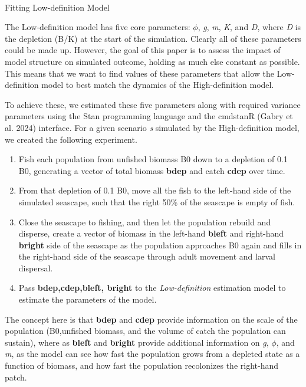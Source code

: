 \documentclass[
  default,
  lineno,
  referee]{sn-jnl}
\makeatletter
\let\oldparagraph\paragraph
\renewcommand{\paragraph}{
    \@ifstar
      \xxxParagraphStar
      \xxxParagraphNoStar
  }
\newcommand{\xxxParagraphStar}[1]{\oldparagraph*{#1}\mbox{}}
\newcommand{\xxxParagraphNoStar}[1]{\oldparagraph{#1}\mbox{}}
\providecommand{\tightlist}{%
  \setlength{\itemsep}{0pt}\setlength{\parskip}{0pt}}\usepackage{longtable,booktabs,array}
\makeatother
\begin{document}
\paragraph{Fitting Low-definition
Model}\label{fitting-low-definition-model}

The Low-definition model has five core parameters: \(\phi\), \emph{g},
\emph{m}, \emph{K}, and \emph{D}, where \emph{D} is the depletion (B/K)
at the start of the simulation. Clearly all of these parameters could be
made up. However, the goal of this paper is to assess the impact of
model structure on simulated outcome, holding as much else constant as
possible. This means that we want to find values of these parameters
that allow the Low-definition model to best match the dynamics of the
High-definition model.

To achieve these, we estimated these five parameters along with required
variance parameters using the Stan programming language and the cmdstanR
(Gabry et al. 2024) interface. For a given scenario \emph{s} simulated
by the High-definition model, we created the following experiment.

\begin{enumerate}
\def\labelenumi{\arabic{enumi}.}
\tightlist
\item
  Fish each population from unfished biomass B0 down to a depletion of
  0.1 B0, generating a vector of total biomass \textbf{bdep} and catch
  \textbf{cdep} over time.
\item
  From that depletion of 0.1 B0, move all the fish to the left-hand side
  of the simulated seascape, such that the right 50\% of the seascape is
  empty of fish.
\item
  Close the seascape to fishing, and then let the population rebuild and
  disperse, create a vector of biomass in the left-hand \textbf{bleft}
  and right-hand \textbf{bright} side of the seascape as the population
  approaches B0 again and fills in the right-hand side of the seascape
  through adult movement and larval dispersal.
\item
  Pass \textbf{bdep,cdep,bleft, bright} to the \emph{Low-definition}
  estimation model to estimate the parameters of the model.
\end{enumerate}

The concept here is that \textbf{bdep} and \textbf{cdep} provide
information on the scale of the population (B0,unfished biomass, and the
volume of catch the population can sustain), where as \textbf{bleft} and
\textbf{bright} provide additional information on \emph{g}, \(\phi\),
and \emph{m}, as the model can see how fast the population grows from a
depleted state as a function of biomass, and how fast the population
recolonizes the right-hand patch.
\end{document}
